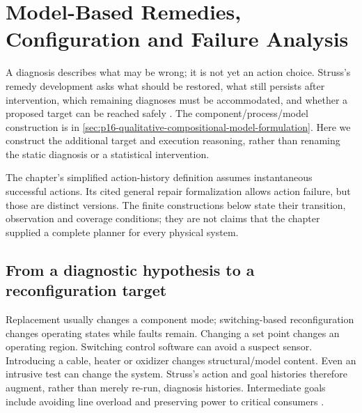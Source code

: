 \chapter{Model-Based Remedies, Configuration and Failure Analysis}
\label{sec:p16-model-based-remedy-and-configuration}

A diagnosis describes what may be wrong; it is not yet an action choice.
Struss's remedy development asks what should be restored, what still persists
after intervention, which remaining diagnoses must be accommodated, and
whether a proposed target can be reached safely
\cite[secs.~10.6--10.7, pp.~446--458]{Struss2008ModelBasedProblemSolving}.
The component/process/model construction is in
\cref{sec:p16-qualitative-compositional-model-formulation}.
Here we construct the additional target and execution reasoning, rather
than renaming the static diagnosis or a statistical intervention.

The chapter's simplified action-history definition assumes instantaneous
successful actions. Its cited general repair formalization allows action
failure, but those are distinct versions. The finite constructions below
state their transition, observation and coverage conditions; they are not
claims that the chapter supplied a complete planner for every physical system.

\section{From a diagnostic hypothesis to a reconfiguration target}
\label{sec:p16-rem-targets}

Replacement usually changes a component mode; switching-based reconfiguration
changes operating states while faults remain. Changing a set point changes
an operating region. Switching control software can avoid a suspect sensor.
Introducing a cable, heater or oxidizer changes structural/model content.
Even an intrusive test can change the system. Struss's action and goal
histories therefore augment, rather than merely re-run, diagnosis histories.
Intermediate goals include avoiding line overload and preserving power to
critical consumers \cite[pp.~447--450]{Struss2008ModelBasedProblemSolving}.

